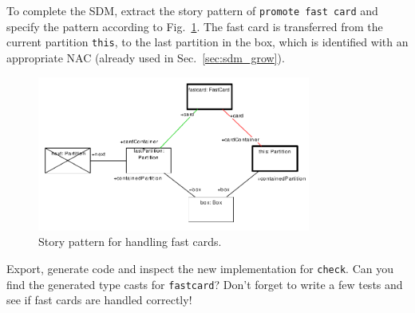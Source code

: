 \clearpage

To complete the SDM, extract the story pattern of \texttt{promote fast card} and
specify the pattern according to Fig.~\ref{fig:sdm_fastcard_5}.  The fast card
is transferred from the current partition \texttt{this}, to the last partition
in the box, which is identified with an appropriate \mbox{NAC} (already used in
Sec.~\ref{sec:sdm_grow}). 

\begin{figure}[htbp]
\begin{center}
  \includegraphics[width=0.8\textwidth]{pics/sdmBilder/bindings/promoteFastCard}
  \caption{Story pattern for handling fast cards.}  
  \label{fig:sdm_fastcard_5}
\end{center}
\end{figure}

Export, generate code and inspect the new implementation for \texttt{check}. 
Can you find the generated type casts for \texttt{fastcard}?  Don't forget to
write a few tests and see if fast cards are handled correctly!


